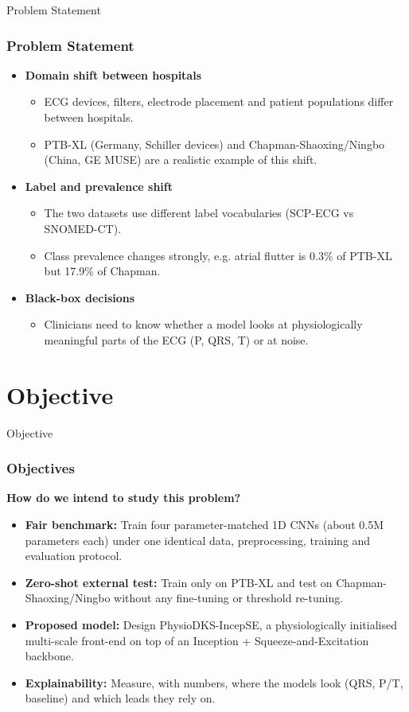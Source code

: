 \documentclass[serif, aspectratio=169]{beamer}
\begin{document}
\begin{frame}{Problem Statement}
	\frametitle<presentation>{Problem Statement}
	\begin{itemize}
		\item \textbf{Domain shift between hospitals}
		\begin{itemize}
			\item ECG devices, filters, electrode placement and patient populations differ between hospitals.
			\item PTB-XL (Germany, Schiller devices) and Chapman-Shaoxing/Ningbo (China, GE MUSE) are a realistic example of this shift.
		\end{itemize}
		\item \textbf{Label and prevalence shift}
		\begin{itemize}
			\item The two datasets use different label vocabularies (SCP-ECG vs SNOMED-CT).
			\item Class prevalence changes strongly, e.g. atrial flutter is 0.3\% of PTB-XL but 17.9\% of Chapman.
		\end{itemize}
		\item \textbf{Black-box decisions}
		\begin{itemize}
			\item Clinicians need to know whether a model looks at physiologically meaningful parts of the ECG (P, QRS, T) or at noise.
		\end{itemize}
	\end{itemize}
\end{frame}

\section{Objective}

\begin{frame}{Objective}
	\frametitle<presentation>{Objectives}
	\textbf{How do we intend to study this problem?}\par
	\begin{itemize}
		\item \textbf{Fair benchmark:} Train four parameter-matched 1D CNNs (about 0.5M parameters each) under one identical data, preprocessing, training and evaluation protocol.
		\item \textbf{Zero-shot external test:} Train only on PTB-XL and test on Chapman-Shaoxing/Ningbo without any fine-tuning or threshold re-tuning.
		\item \textbf{Proposed model:} Design PhysioDKS-IncepSE, a physiologically initialised multi-scale front-end on top of an Inception + Squeeze-and-Excitation backbone.
		\item \textbf{Explainability:} Measure, with numbers, where the models look (QRS, P/T, baseline) and which leads they rely on.
	\end{itemize}
\end{frame}
\end{document}
